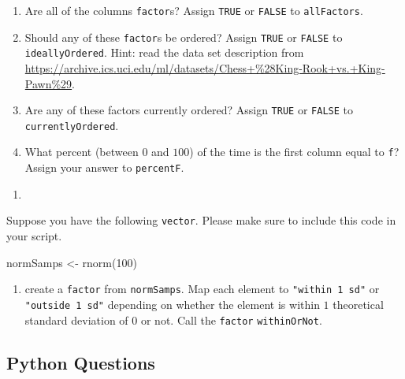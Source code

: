 \documentclass[
  12pt,
  krantz2]{krantz}
\makeatletter
\newenvironment{Shaded}{\begin{snugshade}}{\end{snugshade}}
\newcommand{\DecValTok}[1]{\textcolor[rgb]{0.06,0.06,0.06}{#1}}
\newcommand{\FunctionTok}[1]{\textcolor[rgb]{0,0,0}{#1}}
\newcommand{\NormalTok}[1]{#1}
\newcommand{\OtherTok}[1]{\textcolor[rgb]{0.37,0.37,0.37}{#1}}
\providecommand{\tightlist}{%
  \setlength{\itemsep}{0pt}\setlength{\parskip}{0pt}}
\newenvironment{kframe}{%
\medskip{}
\setlength{\fboxsep}{.8em}
 \def\at@end@of@kframe{}%
 \ifinner\ifhmode%
  \def\at@end@of@kframe{\end{minipage}}%
  \begin{minipage}{\columnwidth}%
 \fi\fi%
 \def\FrameCommand##1{\hskip\@totalleftmargin \hskip-\fboxsep
 \colorbox{shadecolor}{##1}\hskip-\fboxsep
     \hskip-\linewidth \hskip-\@totalleftmargin \hskip\columnwidth}%
 \MakeFramed {\advance\hsize-\width
   \@totalleftmargin\z@ \linewidth\hsize
   \@setminipage}}%
 {\par\unskip\endMakeFramed%
 \at@end@of@kframe}
\renewenvironment{Shaded}{\begin{kframe}}{\end{kframe}}
\makeatother
\begin{document}
\begin{enumerate}
\def\labelenumi{\alph{enumi})}
\tightlist
\item
  Are all of the columns \texttt{factor}s? Assign \texttt{TRUE} or \texttt{FALSE} to \texttt{allFactors}.
\item
  Should any of these \texttt{factor}s be ordered? Assign \texttt{TRUE} or \texttt{FALSE} to \texttt{ideallyOrdered}. Hint: read the data set description from \url{https://archive.ics.uci.edu/ml/datasets/Chess+\%28King-Rook+vs.+King-Pawn\%29}.
\item
  Are any of these factors currently ordered? Assign \texttt{TRUE} or \texttt{FALSE} to \texttt{currentlyOrdered}.
\item
  What percent (between \(0\) and \(100\)) of the time is the first column equal to \texttt{\textquotesingle{}f\textquotesingle{}}? Assign your answer to \texttt{percentF}.
\end{enumerate}

\begin{enumerate}
\def\labelenumi{\arabic{enumi}.}
\setcounter{enumi}{1}
\tightlist
\item
\end{enumerate}

Suppose you have the following \texttt{vector}. Please make sure to include this code in your script.

\begin{Shaded}
\begin{Highlighting}[]
\NormalTok{normSamps }\OtherTok{\textless{}{-}} \FunctionTok{rnorm}\NormalTok{(}\DecValTok{100}\NormalTok{)}
\end{Highlighting}
\end{Shaded}

\begin{enumerate}
\def\labelenumi{\alph{enumi})}
\tightlist
\item
  create a \texttt{factor} from \texttt{normSamps}. Map each element to \texttt{"within\ 1\ sd"} or \texttt{"outside\ 1\ sd"} depending on whether the element is within \(1\) theoretical standard deviation of \(0\) or not. Call the \texttt{factor} \texttt{withinOrNot}.
\end{enumerate}

\hypertarget{python-questions-5}{%
\subsection{Python Questions}\label{python-questions-5}}
\end{document}
